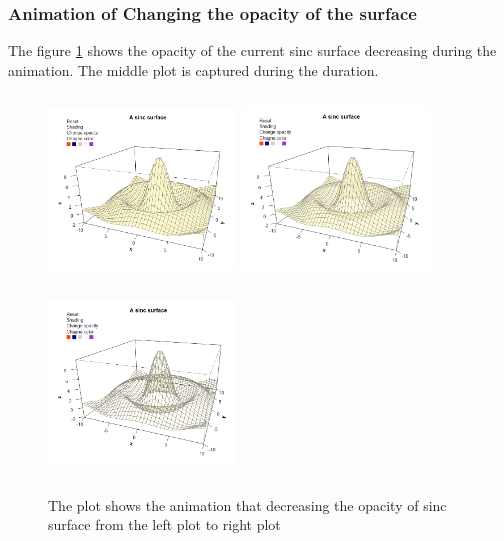 \documentclass[paper=a4, fontsize=11pt]{report}
\begin{document}
\subsubsection*{Animation of Changing the opacity of the surface}
The figure \ref{Example_6.3.2} shows the opacity of the current sinc surface decreasing during the animation. The middle plot is captured during the duration. 
\begin{figure}[h]
\begin{center}
  \includegraphics[height = 5cm, width = 5cm]{figure/svg/origin_1.PNG}
  \includegraphics[height = 5cm, width = 5cm]{figure/svg/opacity_2.PNG}
  \includegraphics[height = 5cm, width = 5cm]{figure/svg/opacity_3.PNG}
  \caption{The plot shows the animation that decreasing the opacity of sinc surface from the left plot to right plot}
  	\label{Example_6.3.2}
\end{center}
\end{figure}
\end{document}
